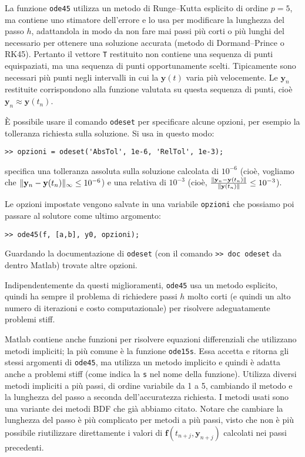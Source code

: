 \documentclass[a4paper]{report}
\DeclarePairedDelimiter{\norm}{\lVert}{\rVert}
\theoremstyle{definiton}
\theoremstyle{remark}
\newcommand{\y}{\mathbf{y}}
\newcommand{\f}{\mathbf{f}}
\begin{document}
La funzione \lstinline{ode45} utilizza un metodo di Runge--Kutta esplicito di ordine $p=5$, ma contiene uno stimatore dell'errore e lo usa per modificare la lunghezza del passo $h$, adattandola in modo da non fare mai passi più corti o più lunghi del necessario per ottenere una soluzione accurata (metodo di Dormand--Prince o RK45). Pertanto il vettore \lstinline{T} restituito non contiene una sequenza di punti equispaziati, ma una sequenza di punti opportunamente scelti. Tipicamente sono necessari più punti negli intervalli in cui la $\y(t)$ varia più velocemente. Le $\y_n$ restituite corrispondono alla funzione valutata su questa sequenza di punti, cioè $\y_n \approx \y(t_n)$.

È possibile usare il comando \lstinline{odeset} per specificare alcune opzioni, per esempio la tolleranza richiesta sulla soluzione. Si usa in questo modo:
\begin{lstlisting}
>> opzioni = odeset('AbsTol', 1e-6, 'RelTol', 1e-3);
\end{lstlisting}
specifica una tolleranza assoluta sulla soluzione calcolata di $10^{-6}$ (cioè, vogliamo che $\norm{\y_n - \y(t_n)}_\infty \leq 10^{-6}$) e una relativa di $10^{-3}$ (cioè, $\frac{\norm{\y_n - \y(t_n)}}{\norm{\y(t_n)}} \leq 10^{-3}$).

Le opzioni impostate vengono salvate in una variabile \lstinline{opzioni} che possiamo poi passare al solutore come ultimo argomento:
\begin{lstlisting}
>> ode45(f, [a,b], y0, opzioni);
\end{lstlisting}
Guardando la documentazione di \lstinline{odeset} (con il comando \lstinline{>> doc odeset} da dentro Matlab) trovate altre opzioni.

Indipendentemente da questi miglioramenti, \lstinline{ode45} usa un metodo esplicito, quindi ha sempre il problema di richiedere passi $h$ molto corti (e quindi un alto numero di iterazioni e costo computazionale) per risolvere adeguatamente problemi stiff.

Matlab contiene anche funzioni per risolvere equazioni differenziali che utilizzano metodi impliciti; la più comune è la funzione \lstinline{ode15s}. Essa accetta e ritorna gli stessi argomenti di \lstinline{ode45}, ma utilizza un metodo implicito e quindi è adatta anche a problemi stiff (come indica la \lstinline{s} nel nome della funzione). Utilizza diversi metodi impliciti a più passi, di ordine variabile da 1 a 5, cambiando il metodo e la lunghezza del passo a seconda dell'accuratezza richiesta. I metodi usati sono una variante dei metodi BDF che già abbiamo citato. Notare che cambiare la lunghezza del passo è più complicato per metodi a più passi, visto che non è più possibile riutilizzare direttamente i valori di $\f(t_{n+j},\y_{n+j})$ calcolati nei passi precedenti.
\end{document}
